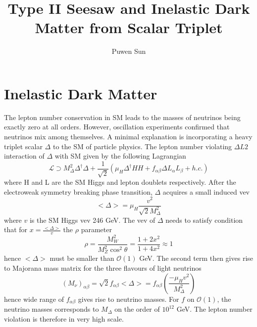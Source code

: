 \documentclass[12pt]{article}
\begin{document}
\title{Type II Seesaw and Inelastic Dark Matter from Scalar Triplet}
\author{Puwen Sun}
\date{}
\maketitle

\section{Inelastic Dark Matter}

The lepton number conservation in SM leads to the masses of neutrinos being exactly zero at all orders. However, oscillation experiments confirmed that neutrinos mix among themselves. A minimal explanation is incorporating a heavy triplet scalar $\Delta$ to the SM of particle physics. The lepton number violating $\Delta L2$ interaction of $\Delta$ with SM given by the following Lagrangian
$$
\mathcal L \supset M_\Delta ^2 \Delta^\dagger \Delta + \frac{1}{\sqrt{2}} (\mu_H \Delta^\dagger HH + f_{\alpha\beta}\Delta L_\alpha L_\beta+h.c.)
$$
where H and L are the SM Higgs and lepton doublets respectively. After the electroweak symmetry breaking phase transition, $\Delta$ acquires a small induced vev
$$
<\Delta> = \mu_H \frac{v^2}{\sqrt 2 M_\Delta^2}
$$
where $v$ is the SM Higgs vev 246 GeV. The vev of $\Delta$ needs to satisfy condition that for $x=\frac{<\Delta>}{v}$ the $\rho$ parameter
$$
\rho = \frac{M_W^2}{M_Z^2 \cos^2 \theta} = \frac{1+2x^2}{1+4x^2} \approx 1
$$
hence $<\Delta> $ must be smaller than $\mathcal O(1)$ GeV. The second term then gives rise to Majorana mass matrix for the three flavours of light neutrinos
$$
(M_\nu)_{\alpha\beta} = \sqrt 2 f_{\alpha\beta}<\Delta> = f_{\alpha\beta}(\frac{-\mu_H v^2}{M_\Delta^2})
$$
hence wide range of $f_{\alpha\beta}$ gives rise to neutrino masses. For $f$ on $\mathcal O(1)$, the neutrino masses corresponds to $M_\Delta$ on the order of $10^{12}$ GeV. The lepton number violation is therefore in very high scale. 
\end{document}

